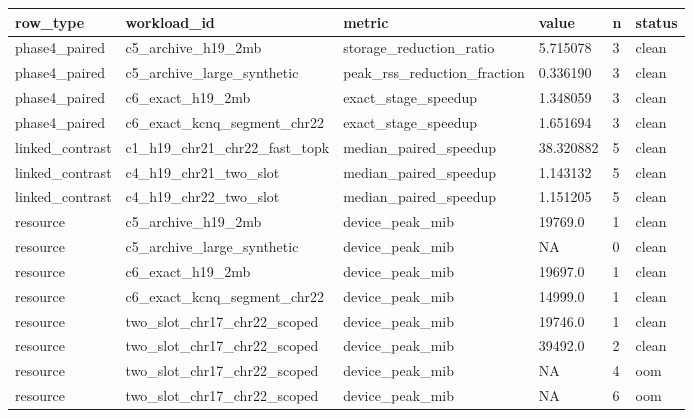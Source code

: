 \begin{tabular}{llllll}
\toprule
row\_type & workload\_id & metric & value & n & status \\
\midrule
phase4\_paired & c5\_archive\_h19\_2mb & storage\_reduction\_ratio & 5.715078 & 3 & clean \\
phase4\_paired & c5\_archive\_large\_synthetic & peak\_rss\_reduction\_fraction & 0.336190 & 3 & clean \\
phase4\_paired & c6\_exact\_h19\_2mb & exact\_stage\_speedup & 1.348059 & 3 & clean \\
phase4\_paired & c6\_exact\_kcnq\_segment\_chr22 & exact\_stage\_speedup & 1.651694 & 3 & clean \\
linked\_contrast & c1\_h19\_chr21\_chr22\_fast\_topk & median\_paired\_speedup & 38.320882 & 5 & clean \\
linked\_contrast & c4\_h19\_chr21\_two\_slot & median\_paired\_speedup & 1.143132 & 5 & clean \\
linked\_contrast & c4\_h19\_chr22\_two\_slot & median\_paired\_speedup & 1.151205 & 5 & clean \\
resource & c5\_archive\_h19\_2mb & device\_peak\_mib & 19769.0 & 1 & clean \\
resource & c5\_archive\_large\_synthetic & device\_peak\_mib & NA & 0 & clean \\
resource & c6\_exact\_h19\_2mb & device\_peak\_mib & 19697.0 & 1 & clean \\
resource & c6\_exact\_kcnq\_segment\_chr22 & device\_peak\_mib & 14999.0 & 1 & clean \\
resource & two\_slot\_chr17\_chr22\_scoped & device\_peak\_mib & 19746.0 & 1 & clean \\
resource & two\_slot\_chr17\_chr22\_scoped & device\_peak\_mib & 39492.0 & 2 & clean \\
resource & two\_slot\_chr17\_chr22\_scoped & device\_peak\_mib & NA & 4 & oom \\
resource & two\_slot\_chr17\_chr22\_scoped & device\_peak\_mib & NA & 6 & oom \\
\bottomrule
\end{tabular}
